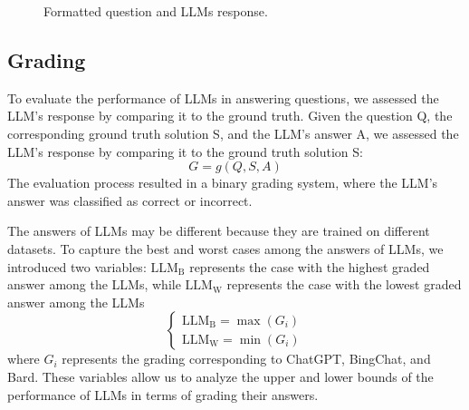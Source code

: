 \documentclass[11pt]{article}
\begin{document}
\begin{figure*}[ht!]
	\begin{center}
\end{center}
	\caption{Formatted question and LLMs response.}
	\label{fig:chatbot_response}
\end{figure*}

\subsection{Grading}

To evaluate the performance of LLMs in answering questions, we assessed the LLM's response by comparing it to the ground truth. Given the question Q, the corresponding ground truth solution S, and the LLM's answer A, we assessed the LLM's response by comparing it to the ground truth solution S: 
\begin{equation}
	G = g(Q, S, A)  
\end{equation}
The evaluation process resulted in a binary grading system, where the LLM's answer was classified as correct or incorrect.

The answers of LLMs may be different because they are trained on different datasets. To capture the best and worst cases among the answers of LLMs, we introduced two variables: $\mathrm{LLM_{B}}$ represents the case with the highest graded answer among the LLMs, while $\mathrm{LLM_{W}}$ represents the case with the lowest graded answer among the LLMs
\begin{equation}
	\left\{\begin{matrix}
		\mathrm{LLM_{B}} = \max(G_i) \\
		\mathrm{LLM_{W}} = \min(G_i)
	\end{matrix}\right. 
\end{equation}
where $G_i$ represents the grading corresponding to ChatGPT, BingChat, and Bard. These variables allow us to analyze the upper and lower bounds of the performance of LLMs in terms of grading their answers.
\end{document}
